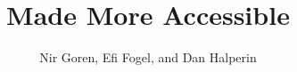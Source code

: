 \documentclass{article}
\title{\cgal{} Made More Accessible}
\date{}
\author{Nir Goren, Efi Fogel, and Dan Halperin}
\newif\iffinal
\begin{document}
\maketitle









\iffinal{
  
\else
  
  
\fi
\appendix

\end{document}
